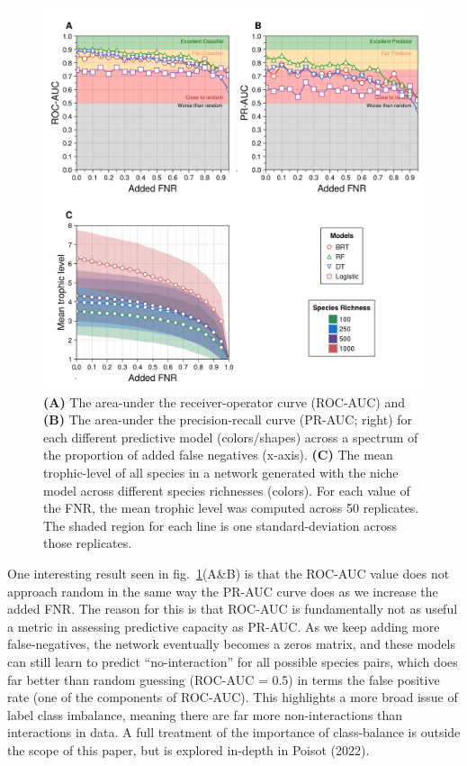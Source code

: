 \documentclass[10pt,oneside]{article}
\makeatletter
\def\maxwidth{\ifdim\Gin@nat@width>\linewidth\linewidth
\else\Gin@nat@width\fi}
\let\Oldincludegraphics\includegraphics
\renewcommand{\includegraphics}[1]{\Oldincludegraphics[width=\maxwidth]{#1}}
\makeatother
\begin{document}
\begin{figure}
\hypertarget{fig:addedfnr}{%
\centering
\includegraphics{./figures/fig3.png}
\caption{\textbf{(A)} The area-under the receiver-operator curve
(ROC-AUC) and \textbf{(B)} The area-under the precision-recall curve
(PR-AUC; right) for each different predictive model (colors/shapes)
across a spectrum of the proportion of added false negatives (x-axis).
\textbf{(C)} The mean trophic-level of all species in a network
generated with the niche model across different species richnesses
(colors). For each value of the FNR, the mean trophic level was computed
across 50 replicates. The shaded region for each line is one
standard-deviation across those replicates.}\label{fig:addedfnr}
}
\end{figure}

One interesting result seen in fig.~\ref{fig:addedfnr}(A\&B) is that the
ROC-AUC value does not approach random in the same way the PR-AUC curve
does as we increase the added FNR. The reason for this is that ROC-AUC
is fundamentally not as useful a metric in assessing predictive capacity
as PR-AUC. As we keep adding more false-negatives, the network
eventually becomes a zeros matrix, and these models can still learn to
predict ``no-interaction'' for all possible species pairs, which does
far better than random guessing (ROC-AUC = 0.5) in terms the false
positive rate (one of the components of ROC-AUC). This highlights a more
broad issue of label class imbalance, meaning there are far more
non-interactions than interactions in data. A full treatment of the
importance of class-balance is outside the scope of this paper, but is
explored in-depth in Poisot (2022).
\end{document}
